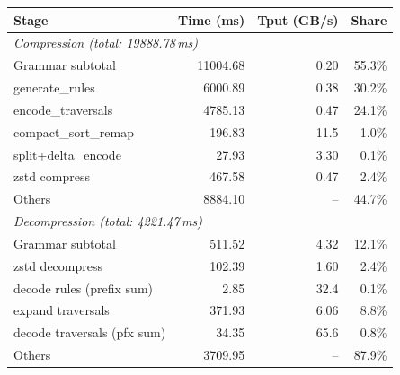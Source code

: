 \setlength{\tabcolsep}{2pt}
\begin{tabular}{l r r r}
  \hline
  \textbf{Stage}                     & \textbf{Time (ms)} & \textbf{Tput (GB/s)} & \textbf{Share} \\
  \hline
  \multicolumn{4}{l}{\textit{Compression (total: 19888.78\,ms)}}                                  \\
  Grammar subtotal                   & 11004.68            & 0.20                  & 55.3\%         \\
  \quad generate\_rules              & 6000.89             & 0.38                  & 30.2\%         \\
  \quad encode\_traversals           & 4785.13             & 0.47                  & 24.1\%         \\
  \quad compact\_sort\_remap         & 196.83              & 11.5                  & 1.0\%          \\
  \quad split+delta\_encode          & 27.93               & 3.30                  & 0.1\%          \\
  \quad zstd compress                & 467.58              & 0.47                  & 2.4\%          \\
  Others                             & 8884.10             & --                    & 44.7\%         \\
  \hline
  \multicolumn{4}{l}{\textit{Decompression (total: 4221.47\,ms)}}                                 \\
  Grammar subtotal                   & 511.52              & 4.32                  & 12.1\%         \\
  \quad zstd decompress              & 102.39              & 1.60                  & 2.4\%          \\
  \quad decode rules (prefix sum)    & 2.85                & 32.4                  & 0.1\%          \\
  \quad expand traversals            & 371.93              & 6.06                  & 8.8\%          \\
  \quad decode traversals (pfx sum)  & 34.35               & 65.6                  & 0.8\%          \\
  Others                             & 3709.95             & --                    & 87.9\%         \\
  \hline
\end{tabular}
